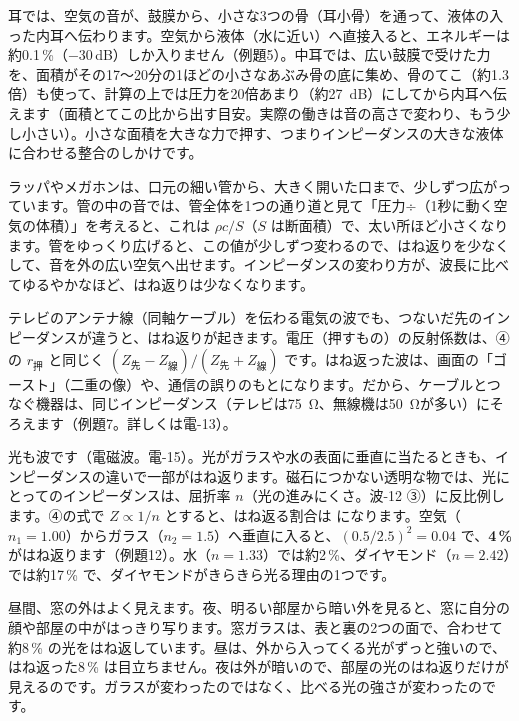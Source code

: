 \begin{phmijika}[耳の中の整合：中耳]
耳では、空気の音が、鼓膜から、小さな3つの骨（耳小骨）を通って、液体の入った内耳へ伝わります。空気から液体（水に近い）へ直接入ると、エネルギーは約0.1\,\%（$-30$\,dB）しか入りません（例題5）。中耳では、広い鼓膜で受けた力を、面積がその17〜20分の1ほどの小さなあぶみ骨の底に集め、骨のてこ（約1.3倍）も使って、計算の上では圧力を20倍あまり（約\qty{27}{dB}）にしてから内耳へ伝えます（面積とてこの比から出す目安。実際の働きは音の高さで変わり、もう少し小さい）。小さな面積を大きな力で押す、つまりインピーダンスの大きな液体に合わせる整合のしかけです。
\end{phmijika}

ラッパやメガホンは、口元の細い管から、大きく開いた口まで、少しずつ広がっています。管の中の音では、管全体を1つの通り道と見て「圧力÷（1秒に動く空気の体積）」を考えると、これは $\rho c/S$（$S$ は断面積）で、太い所ほど小さくなります。管をゆっくり広げると、この値が少しずつ変わるので、はね返りを少なくして、音を外の広い空気へ出せます。インピーダンスの変わり方が、波長に比べてゆるやかなほど、はね返りは少なくなります。

テレビのアンテナ線（同軸ケーブル）を伝わる電気の波でも、つないだ先のインピーダンスが違うと、はね返りが起きます。電圧（押すもの）の反射係数は、④の $r_{\text{押}}$ と同じく $(Z_{\text{先}}-Z_{\text{線}})/(Z_{\text{先}}+Z_{\text{線}})$ です。はね返った波は、画面の「ゴースト」（二重の像）や、通信の誤りのもとになります。だから、ケーブルとつなぐ機器は、同じインピーダンス（テレビは\qty{75}{\ohm}、無線機は\qty{50}{\ohm}が多い）にそろえます（例題7。詳しくは電-13）。

\label{ph:波-7:sec9}
光も波です（電磁波。電-15）。光がガラスや水の表面に垂直に当たるときも、インピーダンスの違いで一部がはね返ります。磁石につかない透明な物では、光にとってのインピーダンスは、屈折率 $n$（光の進みにくさ。波-12 ③）に反比例します。④の式で $Z\propto1/n$ とすると、はね返る割合は
\label{ph:波-7:hikari}になります。空気（$n_1=1.00$）からガラス（$n_2=1.5$）へ垂直に入ると、$(0.5/2.5)^2=0.04$ で、\textbf{4\,\%} がはね返ります（例題12）。水（$n=1.33$）では約2\,\%、ダイヤモンド（$n=2.42$）では約17\,\% で、ダイヤモンドがきらきら光る理由の1つです。

\begin{phmijika}[夜の窓ガラス]
昼間、窓の外はよく見えます。夜、明るい部屋から暗い外を見ると、窓に自分の顔や部屋の中がはっきり写ります。窓ガラスは、表と裏の2つの面で、合わせて約8\,\% の光をはね返しています。昼は、外から入ってくる光がずっと強いので、はね返った8\,\% は目立ちません。夜は外が暗いので、部屋の光のはね返りだけが見えるのです。ガラスが変わったのではなく、比べる光の強さが変わったのです。
\end{phmijika}

